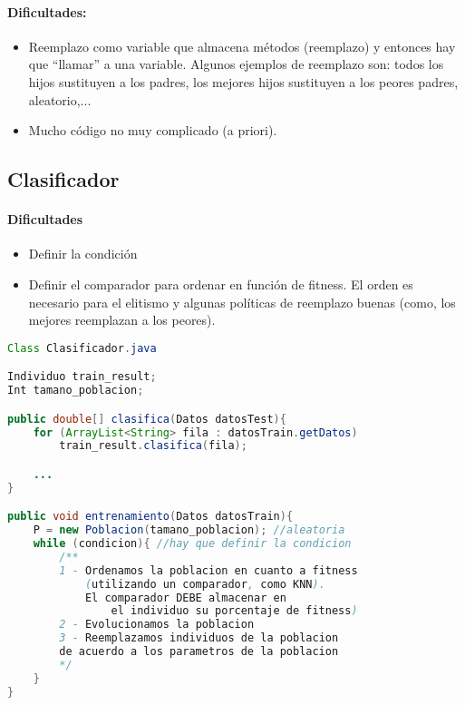 \documentclass[nochap]{apuntes}
\begin{document}
\paragraph{Dificultades:}
\begin{itemize}
	\item Reemplazo como variable que almacena métodos (reemplazo) y entonces hay que ``llamar'' a una variable. Algunos ejemplos de reemplazo son: todos los hijos sustituyen a los padres, los mejores hijos sustituyen a los peores padres, aleatorio,...

	\item Mucho código no muy complicado (a priori).
\end{itemize}




\subsection{Clasificador}

\paragraph{Dificultades} 

\begin{itemize}
	\item Definir la condición
	\item Definir el comparador para ordenar en función de fitness.
	\subitem El orden es necesario para el elitismo y algunas políticas de reemplazo buenas (como, los mejores reemplazan a los peores).
\end{itemize}

\begin{lstlisting}[language=Java]
Class Clasificador.java 

Individuo train_result;
Int tamano_poblacion;

public double[] clasifica(Datos datosTest){
	for (ArrayList<String> fila : datosTrain.getDatos)
		train_result.clasifica(fila);

	...
}

public void entrenamiento(Datos datosTrain){
	P = new Poblacion(tamano_poblacion); //aleatoria
	while (condicion){ //hay que definir la condicion 
		/**
		1 - Ordenamos la poblacion en cuanto a fitness 
			(utilizando un comparador, como KNN).
			El comparador DEBE almacenar en 
				el individuo su porcentaje de fitness)
		2 - Evolucionamos la poblacion
		3 - Reemplazamos individuos de la poblacion 
		de acuerdo a los parametros de la poblacion
		*/
	}
}

\end{lstlisting}
\end{document}
